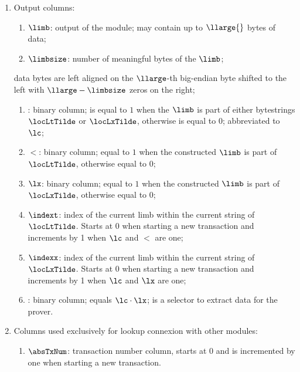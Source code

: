 \begin{enumerate}
    \item Output columns:
        \begin{enumerate}
            \item $\limb$:
                output of the module;
                may contain up to $\llarge{}$ bytes of data;
            \item $\limbsize$:
                number of meaningful bytes of the $\limb$;
        \end{enumerate}
        data bytes are left aligned on the $\llarge$-th big-endian byte shifted to the left with $\llarge - \limbsize$ zeros on the right;
        \begin{enumerate}[resume]
            \item {}:
                binary column;
                is equal to $1$ when the $\limb$ is part of either \rlp{} bytestrings $\locLtTilde$ or $\locLxTilde$, otherwise is equal to $0$;
                abbreviated to $\lc$;
            \item $\lt$:
                binary column; equal to $1$ when the constructed $\limb$ is part of $\locLtTilde$, otherwise equal to $0$;
            \item $\lx$:
                binary column; equal to $1$ when the constructed $\limb$ is part of $\locLxTilde$, otherwise equal to $0$;
            \item $\indext$:
                index of the current limb within the current string of $\locLtTilde$. Starts at 0 when starting a new transaction and increments by 1 when $\lc$ and $\lt$ are one; 
            \item $\indexx$:                                                       
                index of the current limb within the current string of $\locLxTilde$. Starts at 0 when starting a new transaction and increments by 1 when $\lc$ and $\lx$ are one;
            \item \toHashByProver{}:
                binary column; equals $\lc \cdot \lx$; is a selector to extract data for the prover. 
        \end{enumerate} 
    \item Columns used exclusively for lookup connexion with other modules:
        \begin{enumerate}
            \item $\absTxNum$:
                transaction number column, starts at 0 and is incremented by one when starting a new transaction.

\end{enumerate}
\end{enumerate}
